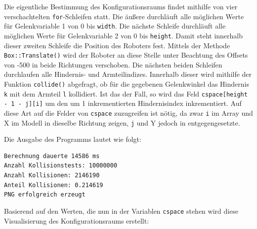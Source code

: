 \documentclass[11pt, a4paper]{article}
\newcommand{\code}{\texttt}
\begin{document}
Die eigentliche Bestimmung des Konfigurationsraums findet mithilfe von vier verschachtelten \code{for}-Schleifen statt. Die äußere durchläuft alle möglichen Werte für Gelenkvariable 1 von 0 bis \code{width}. Die nächste Schleife durchläuft alle möglichen Werte für Gelenkvariable 2 von 0 bis \code{height}. Damit steht innerhalb dieser zweiten Schleife die Position des Roboters fest. Mittels der Methode \code{Box::Translate()} wird der Roboter an diese Stelle unter Beachtung des Offsets von -500 in beide Richtungen verschoben. Die nächsten beiden Schleifen durchlaufen alle Hindernis- und Armteilindizes. Innerhalb dieser wird mithilfe der Funktion \code{collide()} abgefragt, ob für die gegebenen Gelenkwinkel das Hindernis \code{k} mit dem Armteil \code{l} kollidiert. Ist das der Fall, so wird das Feld \code{cspace[height - 1 - j][i]} um den um 1 inkrementierten Hindernisindex inkrementiert. Auf diese Art auf die Felder von \code{cspace} zuzugreifen ist nötig, da zwar \code{i} im Array und X im Modell in dieselbe Richtung zeigen, \code{j} und Y jedoch in entgegengesetzte.
\vspace{11pt}


Die Ausgabe des Programms lautet wie folgt:

\begin{lstlisting}
Berechnung dauerte 14586 ms
Anzahl Kollisionstests: 10000000
Anzahl Kollisionen: 2146190
Anteil Kollisionen: 0.214619
PNG erfolgreich erzeugt
\end{lstlisting}

Basierend auf den Werten, die nun in der Variablen \code{cspace} stehen wird diese Visualisierung des Konfigurationsraums erstellt:
\end{document}
